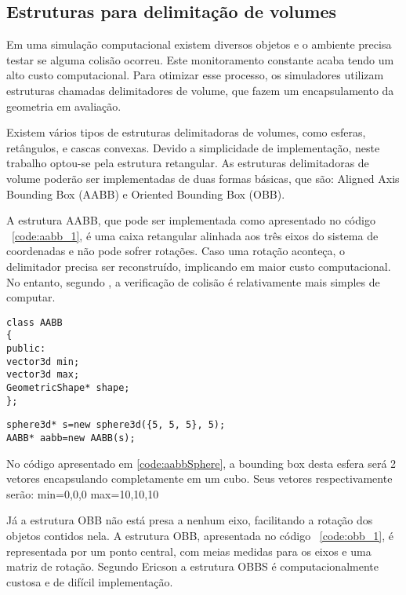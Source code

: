 \subsection{ Estruturas para delimitação de volumes}

Em uma simulação computacional existem diversos objetos e o ambiente precisa testar se alguma colisão ocorreu. Este monitoramento constante acaba tendo um alto custo computacional. Para otimizar esse processo, os simuladores utilizam estruturas chamadas delimitadores de volume, que fazem um encapsulamento da geometria em avaliação.

Existem vários tipos de estruturas delimitadoras de volumes, como esferas, retângulos, e cascas convexas. Devido a simplicidade de implementação, neste trabalho optou-se pela estrutura retangular. As estruturas delimitadoras de volume poderão ser implementadas de duas formas básicas, que são: Aligned Axis Bounding Box (AABB) e Oriented Bounding Box (OBB).

A estrutura AABB, que pode ser implementada como apresentado no código ~\ref{code:aabb_1}, é uma caixa retangular alinhada aos três eixos do sistema de coordenadas e não pode sofrer rotações. Caso uma rotação aconteça, o delimitador precisa ser reconstruído, implicando em maior custo computacional. No entanto, segundo , a verificação de colisão é relativamente mais simples de computar.

\begin{lstlisting}[frame=single,caption=Exemplo de AABB\label{code:aabb_1}]
class AABB
{
public:
vector3d min;
vector3d max;
GeometricShape* shape;
};
\end{lstlisting}

\begin{lstlisting}[frame=single,caption=Exemplo de AABB e Esfera\label{code:aabbSphere}]
sphere3d* s=new sphere3d({5, 5, 5}, 5);
AABB* aabb=new AABB(s);
\end{lstlisting}


No código apresentado em \ref{code:aabbSphere}, a bounding box desta esfera será 2 vetores encapsulando completamente em um cubo. Seus vetores respectivamente serão: min=0,0,0 max=10,10,10

Já a estrutura OBB não está presa a nenhum eixo, facilitando a rotação dos objetos contidos nela. A estrutura OBB, apresentada no código ~\ref{code:obb_1},  é representada por um ponto central, com meias medidas para os eixos e uma matriz de rotação. Segundo Ericson a estrutura OBBS é computacionalmente custosa e de difícil implementação.

